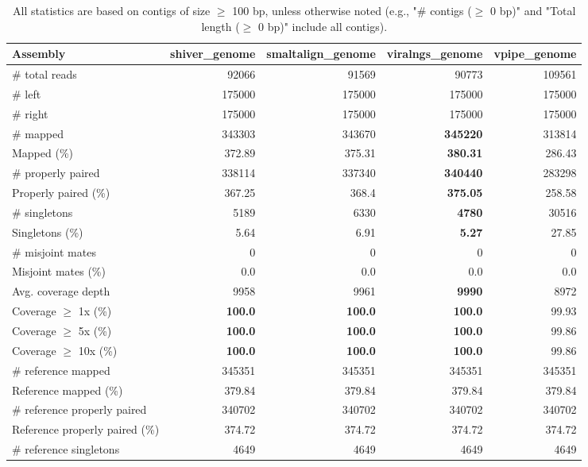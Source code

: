 \documentclass[12pt,a4paper]{article}
\begin{document}
\begin{table}[ht]
\begin{center}
\caption{All statistics are based on contigs of size $\geq$ 100 bp, unless otherwise noted (e.g., "\# contigs ($\geq$ 0 bp)" and "Total length ($\geq$ 0 bp)" include all contigs).}
\begin{tabular}{|l*{4}{|r}|}
\hline
Assembly & shiver\_genome & smaltalign\_genome & viralngs\_genome & vpipe\_genome \\ \hline
\# total reads & 92066 & 91569 & 90773 & 109561 \\ \hline
\# left & 175000 & 175000 & 175000 & 175000 \\ \hline
\# right & 175000 & 175000 & 175000 & 175000 \\ \hline
\# mapped & 343303 & 343670 & {\bf 345220} & 313814 \\ \hline
Mapped (\%) & 372.89 & 375.31 & {\bf 380.31} & 286.43 \\ \hline
\# properly paired & 338114 & 337340 & {\bf 340440} & 283298 \\ \hline
Properly paired (\%) & 367.25 & 368.4 & {\bf 375.05} & 258.58 \\ \hline
\# singletons & 5189 & 6330 & {\bf 4780} & 30516 \\ \hline
Singletons (\%) & 5.64 & 6.91 & {\bf 5.27} & 27.85 \\ \hline
\# misjoint mates & 0 & 0 & 0 & 0 \\ \hline
Misjoint mates (\%) & 0.0 & 0.0 & 0.0 & 0.0 \\ \hline
Avg. coverage depth & 9958 & 9961 & {\bf 9990} & 8972 \\ \hline
Coverage $\geq$ 1x (\%) & {\bf 100.0} & {\bf 100.0} & {\bf 100.0} & 99.93 \\ \hline
Coverage $\geq$ 5x (\%) & {\bf 100.0} & {\bf 100.0} & {\bf 100.0} & 99.86 \\ \hline
Coverage $\geq$ 10x (\%) & {\bf 100.0} & {\bf 100.0} & {\bf 100.0} & 99.86 \\ \hline
\# reference mapped & 345351 & 345351 & 345351 & 345351 \\ \hline
Reference mapped (\%) & 379.84 & 379.84 & 379.84 & 379.84 \\ \hline
\# reference properly paired & 340702 & 340702 & 340702 & 340702 \\ \hline
Reference properly paired (\%) & 374.72 & 374.72 & 374.72 & 374.72 \\ \hline
\# reference singletons & 4649 & 4649 & 4649 & 4649 \\ \hline

\end{tabular}
\end{center}
\end{table}
\end{document}
